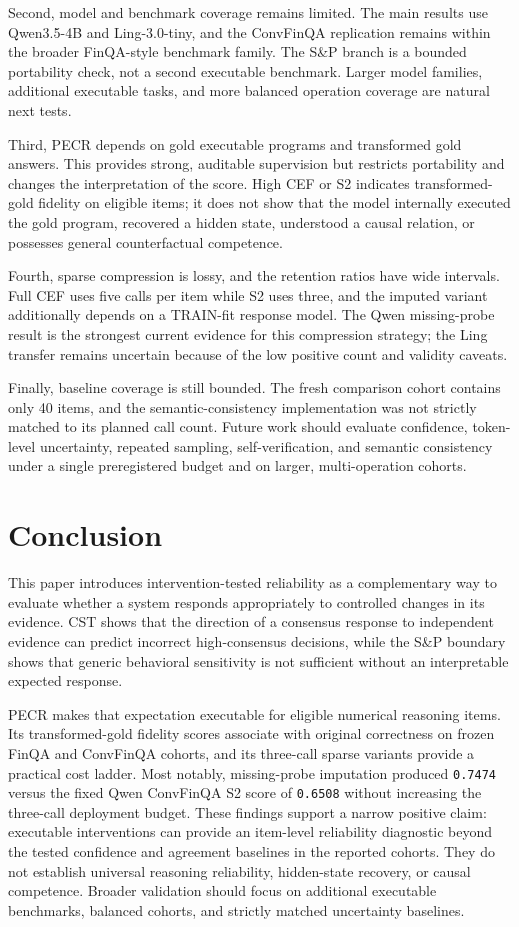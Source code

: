 \documentclass[11pt]{article}
\begin{document}
Second, model and benchmark coverage remains limited. The main results use Qwen3.5-4B and Ling-3.0-tiny, and the ConvFinQA replication remains within the broader FinQA-style benchmark family. The S\&P branch is a bounded portability check, not a second executable benchmark. Larger model families, additional executable tasks, and more balanced operation coverage are natural next tests.

Third, PECR depends on gold executable programs and transformed gold answers. This provides strong, auditable supervision but restricts portability and changes the interpretation of the score. High CEF or S2 indicates transformed-gold fidelity on eligible items; it does not show that the model internally executed the gold program, recovered a hidden state, understood a causal relation, or possesses general counterfactual competence.

Fourth, sparse compression is lossy, and the retention ratios have wide intervals. Full CEF uses five calls per item while S2 uses three, and the imputed variant additionally depends on a TRAIN-fit response model. The Qwen missing-probe result is the strongest current evidence for this compression strategy; the Ling transfer remains uncertain because of the low positive count and validity caveats.

Finally, baseline coverage is still bounded. The fresh comparison cohort contains only 40 items, and the semantic-consistency implementation was not strictly matched to its planned call count. Future work should evaluate confidence, token-level uncertainty, repeated sampling, self-verification, and semantic consistency under a single preregistered budget and on larger, multi-operation cohorts.

\section{Conclusion}

This paper introduces intervention-tested reliability as a complementary way to evaluate whether a system responds appropriately to controlled changes in its evidence. CST shows that the direction of a consensus response to independent evidence can predict incorrect high-consensus decisions, while the S\&P boundary shows that generic behavioral sensitivity is not sufficient without an interpretable expected response.

PECR makes that expectation executable for eligible numerical reasoning items. Its transformed-gold fidelity scores associate with original correctness on frozen FinQA and ConvFinQA cohorts, and its three-call sparse variants provide a practical cost ladder. Most notably, missing-probe imputation produced \texttt{0.7474} versus the fixed Qwen ConvFinQA S2 score of \texttt{0.6508} without increasing the three-call deployment budget. These findings support a narrow positive claim: executable interventions can provide an item-level reliability diagnostic beyond the tested confidence and agreement baselines in the reported cohorts. They do not establish universal reasoning reliability, hidden-state recovery, or causal competence. Broader validation should focus on additional executable benchmarks, balanced cohorts, and strictly matched uncertainty baselines.
\end{document}
